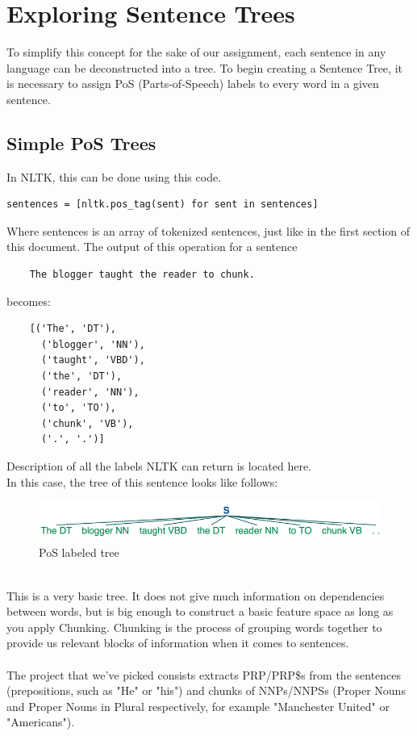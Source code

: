 \documentclass{article}
\begin{document}
\section{Exploring Sentence Trees}
To simplify this concept for the sake of our assignment, each sentence in any language can be deconstructed into a tree. To begin creating a Sentence Tree, it is necessary to assign PoS (Parts-of-Speech)\cite{POS} labels to every word in a given sentence. 
\subsection{Simple PoS Trees}
In NLTK, this can be done using this code.
\begin{verbatim}
sentences = [nltk.pos_tag(sent) for sent in sentences]
\end{verbatim}
Where sentences is an array of tokenized sentences, just like in the first section of this document. The output of this operation for a sentence
\begin{verbatim}
    The blogger taught the reader to chunk.
\end{verbatim}
becomes:
\begin{verbatim}
    [('The', 'DT'),
      ('blogger', 'NN'),
      ('taught', 'VBD'),
      ('the', 'DT'),
      ('reader', 'NN'),
      ('to', 'TO'),
      ('chunk', 'VB'),
      ('.', '.')]
\end{verbatim}
Description of all the labels NLTK can return is located here\cite{POS labels}. \\
In this case, the tree of this sentence looks like follows:
\begin{figure}[htb!]
    \centering
    \includegraphics[width=\textwidth]{nickcdryanblog2.png}
    \caption{PoS labeled tree}
\end{figure}\\
This is a very basic tree. It does not give much information on dependencies between words, but is big enough to construct a basic feature space as long as you apply Chunking. Chunking is the process of grouping words together to provide us relevant blocks of information when it comes to sentences. \\ \\
The project that we've picked consists extracts PRP/PRP\$s from the sentences (prepositions, such as "He" or "his") and chunks of NNPs/NNPSs (Proper Nouns and Proper Nouns in Plural respectively, for example "Manchester United" or "Americans"). \\ \\
\end{document}
